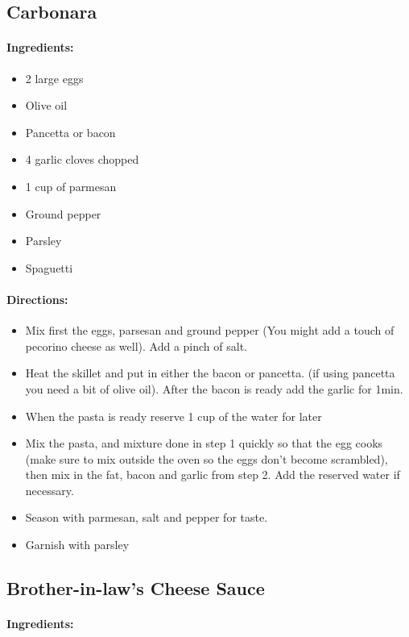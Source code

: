 \documentclass{article}
\begin{document}
\subsection{Carbonara}

\paragraph{Ingredients:}

\begin{itemize}
	\item 2 large eggs
	\item Olive oil
	\item Pancetta or bacon
	\item 4 garlic cloves chopped
	\item 1 cup of parmesan
	\item Ground pepper
	\item Parsley
	\item Spaguetti
\end{itemize}

\paragraph{Directions:}
\begin{itemize}
	\item Mix first the eggs, parsesan and ground pepper (You might add a touch of pecorino cheese as well). Add a pinch of salt.
	\item Heat the skillet and put in either the bacon or pancetta. (if using pancetta you need a bit of olive oil). After the bacon is ready add the garlic for 1min.
	\item When the pasta is ready reserve 1 cup of the water for later
	\item Mix the pasta, and mixture done in step 1 quickly so that the egg cooks (make sure to mix outside the oven so the eggs don’t become scrambled), then mix in the fat, bacon and garlic from step 2. Add the reserved water if necessary.
	\item Season with parmesan, salt and pepper for taste.
	\item Garnish with parsley
\end{itemize}


\subsection{Brother-in-law’s Cheese Sauce}

\paragraph{Ingredients:}
\end{document}
